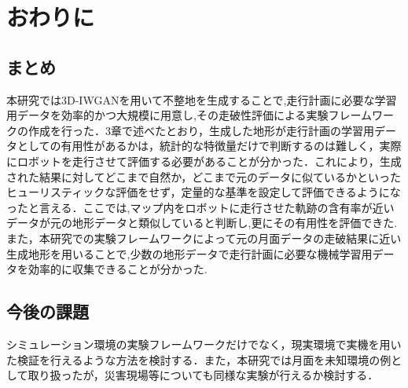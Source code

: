 \documentclass[uplatex,twocolumn, dvipdfmx]{jsarticle}  %
\begin{document}
\section{おわりに}

\subsection{まとめ}
本研究では3D-IWGANを用いて不整地を生成することで,走行計画に必要な学習用データを効率的かつ大規模に用意し,その走破性評価による実験フレームワークの作成を行った．3章で述べたとおり，生成した地形が走行計画の学習用データとしての有用性があるかは，統計的な特徴量だけで判断するのは難しく，実際にロボットを走行させて評価する必要があることが分かった．これにより，生成された結果に対してどこまで自然か，どこまで元のデータに似ているかといったヒューリスティックな評価をせず，定量的な基準を設定して評価できるようになったと言える．ここでは,マップ内をロボットに走行させた軌跡の含有率が近いデータが元の地形データと類似していると判断し,更にその有用性を評価できた.また，本研究での実験フレームワークによって元の月面データの走破結果に近い生成地形を用いることで,少数の地形データで走行計画に必要な機械学習用データを効率的に収集できることが分かった.


\subsection{今後の課題}
シミュレーション環境の実験フレームワークだけでなく，現実環境で実機を用いた検証を行えるような方法を検討する．また，本研究では月面を未知環境の例として取り扱ったが，災害現場等についても同様な実験が行えるか検討する．




\end{document}
